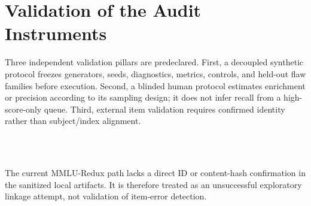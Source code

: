 \section{Validation of the Audit Instruments}

Three independent validation pillars are predeclared. First, a decoupled synthetic protocol freezes
generators, seeds, diagnostics, metrics, controls, and held-out flaw families before execution.
Second, a blinded human protocol estimates enrichment or precision according to its sampling design;
it does not infer recall from a high-score-only queue. Third, external item validation requires
confirmed identity rather than subject/index alignment.

\begin{center}
\\
\\
\end{center}

The current MMLU-Redux path lacks a direct ID or content-hash confirmation in the sanitized local
artifacts. It is therefore treated as an unsuccessful exploratory linkage attempt, not validation
of item-error detection.
